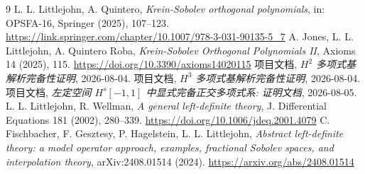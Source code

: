 \documentclass[UTF8]{ctexart}
\begin{document}
\begin{thebibliography}{9}
 L. L. Littlejohn, A. Quintero, \emph{Krein-Sobolev orthogonal
	polynomials}, in: OPSFA-16, Springer (2025), 107--123.
	\url{https://link.springer.com/chapter/10.1007/978-3-031-90135-5_7}
 A. Jones, L. L. Littlejohn, A. Quintero Roba, \emph{Krein-Sobolev
	Orthogonal Polynomials II}, Axioms 14 (2025), 115.
	\url{https://doi.org/10.3390/axioms14020115}
 项目文档, \emph{$H^2$ 多项式基解析完备性证明}, 2026-08-04.
 项目文档, \emph{$H^3$ 多项式基解析完备性证明}, 2026-08-04.
 项目文档, \emph{左定空间 $H^s[-1,1]$ 中显式完备正交多项式系: 证明文档}, 2026-08-05.
 L. L. Littlejohn, R. Wellman, \emph{A general left-definite theory},
	J. Differential Equations 181 (2002), 280--339.
	\url{https://doi.org/10.1006/jdeq.2001.4079}
 C. Fischbacher, F. Gesztesy, P. Hagelstein, L. L. Littlejohn,
	\emph{Abstract left-definite theory: a model operator approach, examples, fractional Sobolev spaces, and interpolation theory}, arXiv:2408.01514 (2024).
	\url{https://arxiv.org/abs/2408.01514}
\end{thebibliography}
\end{document}
